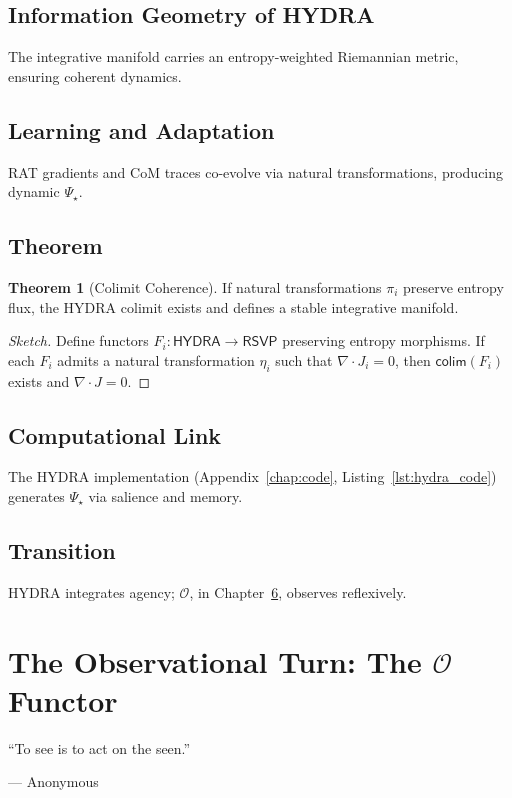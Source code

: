 \documentclass[12pt]{book}
\theoremstyle{definition}
\newtheorem{theorem}{Theorem}[chapter]
\begin{document}
\section{Information Geometry of HYDRA}
The integrative manifold carries an entropy-weighted Riemannian metric, ensuring coherent dynamics.

\section{Learning and Adaptation}
RAT gradients and CoM traces co-evolve via natural transformations, producing dynamic \(\Psi_\star\).

\section{Theorem}
\begin{theorem}[Colimit Coherence]
\label{thm:colimit_coherence}
If natural transformations \(\pi_i\) preserve entropy flux, the HYDRA colimit exists and defines a stable integrative manifold.
\end{theorem}

\begin{proof}[Sketch]
Define functors \(F_i: \textsf{HYDRA} \to \textsf{RSVP}\) preserving entropy morphisms. If each \(F_i\) admits a natural transformation \(\eta_i\) such that \(\nabla \cdot J_i = 0\), then \(\textsf{colim}(F_i)\) exists and \(\nabla \cdot J = 0\).
\end{proof}

\section{Computational Link}
The HYDRA implementation (Appendix~\ref{chap:code}, Listing~\ref{lst:hydra_code}) generates \(\Psi_\star\) via salience and memory.

\section{Transition}
HYDRA integrates agency; \(\mathcal{O}\), in Chapter~\ref{chap:observation}, observes reflexively.

\chapter{The Observational Turn: The \texorpdfstring{\(\mathcal{O}\)}{O} Functor}
\label{chap:observation}
\epigraph{``To see is to act on the seen.''}{--- Anonymous}
\end{document}
